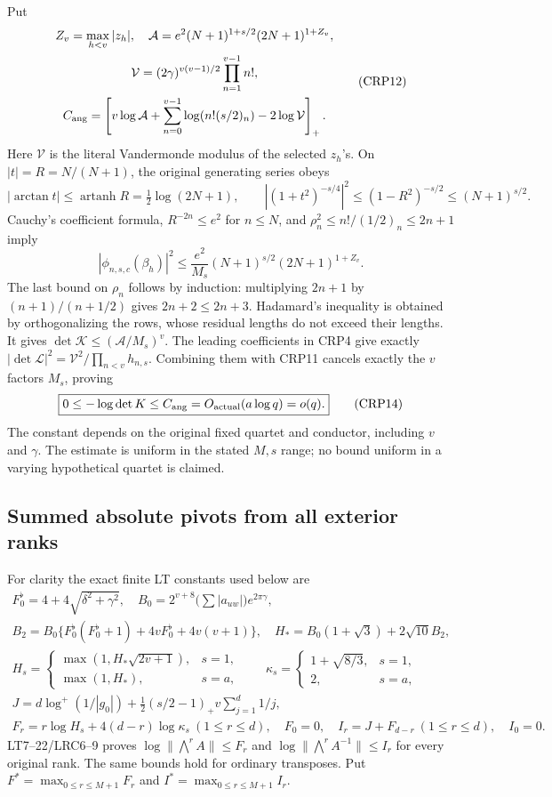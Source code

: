 \documentclass[11pt,a4paper]{article}
\begin{document}
Put
\[
\begin{gathered}
Z_v=\max_{h<v}|z_h|,\quad
\mathcal A=e^2(N+1)^{1+s/2}(2N+1)^{1+Z_v},\\
\mathcal V=(2\gamma)^{v(v-1)/2}\prod_{n=1}^{v-1}n!,\\
C_{\rm ang}=\left[v\log\mathcal A+
 \sum_{n=0}^{v-1}\log(n!(s/2)_n)-2\log\mathcal V\right]_+.
\end{gathered}\tag{CRP12}
\]
Here $\mathcal V$ is the literal Vandermonde modulus of the selected
$z_h$'s. On $|t|=R=N/(N+1)$, the original generating series obeys
\[
|\arctan t|\le\operatorname{artanh}R=\tfrac12\log(2N+1),\qquad
|(1+t^2)^{-s/4}|^2\le(1-R^2)^{-s/2}\le(N+1)^{s/2}.
\]
Cauchy's coefficient formula, $R^{-2n}\le e^2$ for $n\le N$, and
$\rho_n^2\le n!/(1/2)_n\le2n+1$ imply
\[
|\phi_{n,s,c}(\beta_h)|^2\le
 \frac{e^2}{M_s}(N+1)^{s/2}(2N+1)^{1+Z_v}.
\tag{CRP13}
\]
The last bound on $\rho_n$ follows by induction: multiplying $2n+1$
by $(n+1)/(n+1/2)$ gives $2n+2\le2n+3$. Hadamard's inequality is
obtained by orthogonalizing the rows, whose residual lengths do not
exceed their lengths. It gives $\det\mathcal K\le(\mathcal A/M_s)^v$.
The leading coefficients in CRP4 give exactly
$|\det\mathcal L|^2=\mathcal V^2/\prod_{n<v}h_{n,s}$.
Combining them with CRP11 cancels exactly the $v$ factors $M_s$, proving
\[
\boxed{0\le-\log\det K\le C_{\rm ang}
 =O_{\rm actual}(a\log q)=o(q).}\tag{CRP14}
\]
The constant depends on the original fixed quartet and conductor,
including $v$ and $\gamma$. The estimate is uniform in the stated
$M,s$ range; no bound uniform in a varying hypothetical quartet is
claimed.

\subsection{Summed absolute pivots from all exterior ranks}
For clarity the exact finite LT constants used below are
\[
\begin{gathered}
F_0^{\flat}=4+4\sqrt{\delta^2+\gamma^2},\quad
B_0=2^{v+8}\bigl(\sum|a_{uw}|\bigr)e^{2\pi\gamma},\\
B_2=B_0\{F_0^{\flat}(F_0^{\flat}+1)+4vF_0^{\flat}+4v(v+1)\},
\quad H_*=B_0(1+\sqrt3)+2\sqrt{10}B_2,\\
H_s=\begin{cases}\max(1,H_*\sqrt{2v+1}),&s=1,\\
\max(1,H_*),&s=a,\end{cases}\qquad
\kappa_s=\begin{cases}1+\sqrt{8/3},&s=1,\\2,&s=a,\end{cases}\\
J=d\log^+(1/|g_0|)+\tfrac12(s/2-1)_+v\sum_{j=1}^d1/j,\\
F_r=r\log H_s+4(d-r)\log\kappa_s\ (1\le r\le d),
\quad F_0=0,\quad I_r=J+F_{d-r}\ (1\le r\le d),\quad I_0=0.
\end{gathered}\tag{CRP15}
\]
LT7--22/LRC6--9 proves
$\log\|\bigwedge^r A\|\le F_r$ and
$\log\|\bigwedge^r A^{-1}\|\le I_r$ for every original rank.
The same bounds hold for ordinary transposes. Put
$F^*=\max_{0\le r\le M+1}F_r$ and
$I^*=\max_{0\le r\le M+1}I_r$.
\end{document}
